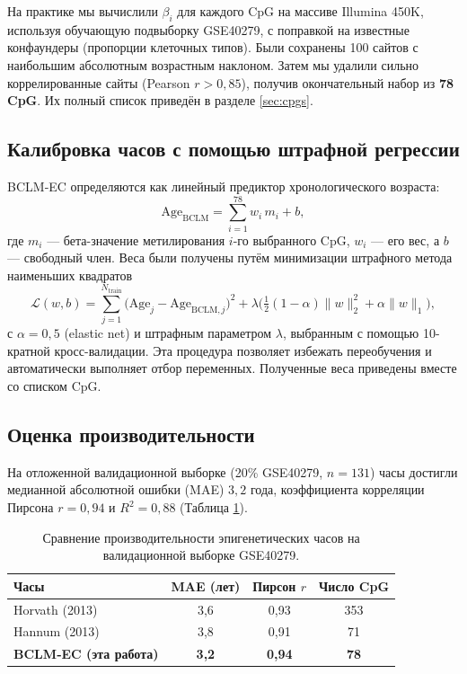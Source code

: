 \documentclass[12pt,a4paper]{article}
\begin{document}
	На практике мы вычислили \(\beta_i\) для каждого CpG на массиве Illumina 450K, используя обучающую подвыборку GSE40279, с поправкой на известные конфаундеры (пропорции клеточных типов). Были сохранены 100 сайтов с наибольшим абсолютным возрастным наклоном. Затем мы удалили сильно коррелированные сайты (Pearson \(r > 0,85\)), получив окончательный набор из \textbf{78 CpG}. Их полный список приведён в разделе \ref{sec:cpgs}.
	
	\subsection{Калибровка часов с помощью штрафной регрессии}
	BCLM‑EC определяются как линейный предиктор хронологического возраста:
	\begin{equation}
		\mathrm{Age}_{\mathrm{BCLM}} = \sum_{i=1}^{78} w_i \, m_i + b,
		\label{eq:clock}
	\end{equation}
	где \(m_i\) — бета-значение метилирования \(i\)-го выбранного CpG, \(w_i\) — его вес, а \(b\) — свободный член. Веса были получены путём минимизации штрафного метода наименьших квадратов
	\[
	\mathcal{L}(w,b) = \sum_{j=1}^{N_{\mathrm{train}}} \bigl( \mathrm{Age}_j - \mathrm{Age}_{\mathrm{BCLM},j} \bigr)^2 + \lambda \bigl( \tfrac{1}{2}(1-\alpha)\|w\|_2^2 + \alpha\|w\|_1 \bigr),
	\]
	с \(\alpha=0,5\) (elastic net) и штрафным параметром \(\lambda\), выбранным с помощью 10-кратной кросс-валидации. Эта процедура позволяет избежать переобучения и автоматически выполняет отбор переменных. Полученные веса приведены вместе со списком CpG.
	
	\subsection{Оценка производительности}
	На отложенной валидационной выборке (20\% GSE40279, \(n=131\)) часы достигли медианной абсолютной ошибки (MAE) \(3,2\) года, коэффициента корреляции Пирсона \(r=0,94\) и \(R^2=0,88\) (Таблица \ref{tab:clock-comparison}).
	
	\begin{table}[H]
		\centering
		\caption{Сравнение производительности эпигенетических часов на валидационной выборке GSE40279.}
		\label{tab:clock-comparison}
		\begin{tabular}{lccc}
			\toprule
			\textbf{Часы} & \textbf{MAE (лет)} & \textbf{Пирсон \(r\)} & \textbf{Число CpG} \\
			\midrule
			Horvath (2013) & 3,6 & 0,93 & 353 \\
			Hannum (2013)\footnotemark & 3,8 & 0,91 & 71 \\
			\textbf{BCLM‑EC (эта работа)} & \textbf{3,2} & \textbf{0,94} & \textbf{78} \\
			\bottomrule
		\end{tabular}
	\end{table}
	
\end{document}
